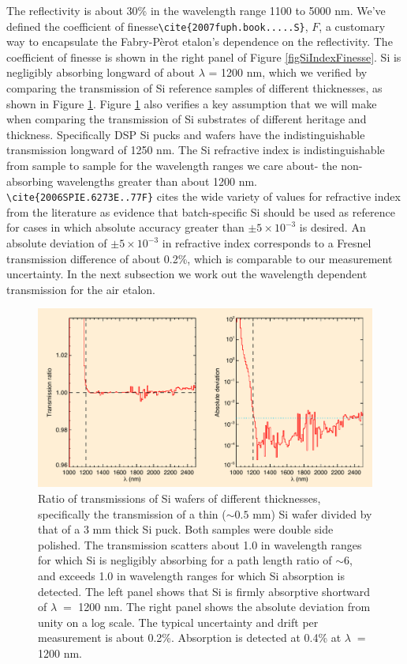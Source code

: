 \documentclass[osajnl,preprint,showpacs,superscriptaddress,12pt]{revtex4-1} %
\begin{document}
The reflectivity is about 30\% in the wavelength range 1100 to 5000 nm.  We've defined the coefficient of finesse\verb|\cite{2007fuph.book.....S}|, $F$, a customary way to encapsulate the Fabry-P\`{e}rot etalon's dependence on the reflectivity.  The coefficient of finesse is shown in the right panel of Figure \ref{figSiIndexFinesse}.  Si is negligibly absorbing longward of about $\lambda$ = 1200 nm, which we verified by comparing the transmission of Si reference samples of different thicknesses, as shown in Figure \ref{figSiAbsorbfig}.  Figure \ref{figSiAbsorbfig} also verifies a key assumption that we will make when comparing the transmission of Si substrates of different heritage and thickness.  Specifically DSP Si pucks and wafers have the indistinguishable transmission longward of 1250 nm.  The Si refractive index is indistinguishable from sample to sample for the wavelength ranges we care about- the non-absorbing wavelengths greater than about 1200 nm.  \verb|\cite{2006SPIE.6273E..77F}| cites the wide variety of values for refractive index from the literature as evidence that batch-specific Si should be used as reference for cases in which absolute accuracy greater than $\pm5\times10^{-3}$ is desired.  An absolute deviation of $\pm5\times10^{-3}$ in refractive index corresponds to a Fresnel transmission difference of about 0.2\%, which is comparable to our measurement uncertainty.  In the next subsection we work out the wavelength dependent transmission for the air etalon.

\begin{figure}[htbp]
\centerline{\includegraphics[width=0.95\columnwidth]{figs/fpAbsorbfig}}
\caption{Ratio of transmissions of Si wafers of different thicknesses, specifically the transmission of a thin ($\sim0.5$ mm) Si wafer divided by that of a 3 mm thick Si puck.  Both samples were double side polished.\label{figSiAbsorbfig}  The transmission scatters about 1.0 in wavelength ranges for which Si is negligibly absorbing for a path length ratio of $\sim$6, and exceeds 1.0 in wavelength ranges for which Si absorption is detected. The left panel shows that Si is firmly absorptive shortward of $\lambda \; =$ 1200 nm.  The right panel shows the absolute deviation from unity on a log scale.  The typical uncertainty and drift per measurement is about 0.2\%.  Absorption is detected at 0.4\% at $\lambda \;=$ 1200 nm.}
\end{figure}
\end{document}
